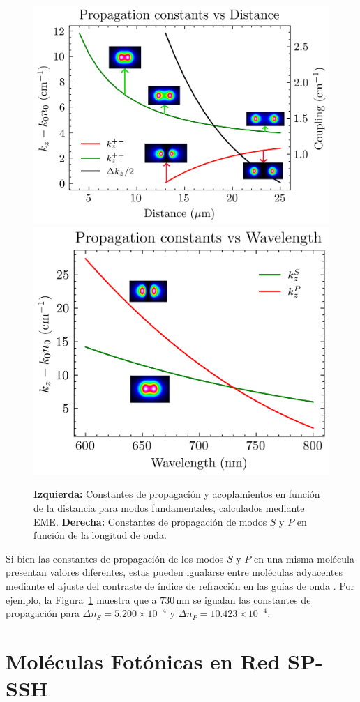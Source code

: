 \begin{figure}[H]
	\centering
	\includegraphics[width=0.50\linewidth]{codigo/dimol2/eigenvalues_vs_angle_1.png}
	\includegraphics[width=0.45\linewidth]{codigo/dimol3/eigenvalues_vs_wavelength.png}
	\caption[Propagación y acoplamientos en moléculas fotónicas]{
		\textbf{Izquierda:} Constantes de propagación y acoplamientos en función de la distancia para modos fundamentales, calculados mediante EME. 
		\textbf{Derecha:} Constantes de propagación de modos $S$ y $P$ en función de la longitud de onda.
		\label{fig:molecule-coup}}
\end{figure}

Si bien las constantes de propagación de los modos $S$ y $P$ en una misma molécula presentan valores diferentes, estas pueden igualarse entre moléculas adyacentes mediante el ajuste del contraste de índice de refracción en las guías de onda \cite{interorbital}. Por ejemplo, la Figura~\ref{fig:molecule-coup} muestra que a $730$\,nm se igualan las constantes de propagación para $\Delta n_S = 5.200 \times 10^{-4}$ y $\Delta n_P = 10.423 \times 10^{-4}$.


\section{Moléculas Fotónicas en Red SP-SSH}

